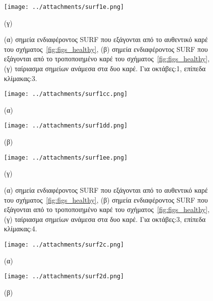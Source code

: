 \begin{figure}[h!]
\begin{minipage}[b]{1.0\linewidth}
\centering
\texttt{[image: ../attachments/surf1e.png]}
\caption*{(γ)}
\label{fig:surf_3}
\end{minipage}
\caption{(α) σημεία ενδιαφέροντος SURF που εξάγονται από το αυθεντικό καρέ του σχήματος~\ref{fig:figs_healthy},
(β) σημεία ενδιαφέροντος SURF που εξάγονται από το τροποποιημένο καρέ του σχήματος~\ref{fig:figs_healthy},
(γ) ταίριασμα σημείων ανάμεσα στα δυο καρέ. Για οκτάβες:1, επίπεδα κλίμακας:3.}
\label{fig:surf_healthy_1}
\end{figure}

 
\newpage

\begin{figure}[!ht]
\begin{minipage}[b]{0.4\linewidth}
\centering
\texttt{[image: ../attachments/surf1cc.png]}
\caption*{(α)}
\label{fig:surf_4}
\end{minipage}
\hspace{0.9cm}
\begin{minipage}[b]{0.7\linewidth}
\centering
\texttt{[image: ../attachments/surf1dd.png]}
\caption*{(β)}
\label{fig:surf_5}
\end{minipage}

 \end{figure}


 
\begin{figure}[!h]
\begin{minipage}[b]{1.0\linewidth}
\centering
\texttt{[image: ../attachments/surf1ee.png]}
\caption*{(γ)}
\label{fig:surf_6}
\end{minipage}
\caption{(α) σημεία ενδιαφέροντος SURF που εξάγονται από το αυθεντικό καρέ του σχήματος~\ref{fig:figs_healthy},
(β) σημεία ενδιαφέροντος SURF που εξάγονται από το τροποποιημένο καρέ του σχήματος~\ref{fig:figs_healthy},
(γ) ταίριασμα σημείων ανάμεσα στα δυο καρέ. Για οκτάβες:3, επίπεδα κλίμακας:4.}
\label{fig:surf_healthy_2}
\end{figure}
 
 

\newpage


 
\begin{figure}[!ht]
\begin{minipage}[b]{0.4\linewidth}
\centering
\texttt{[image: ../attachments/surf2c.png]}
\caption*{(α)}
\label{fig:surf_7}
\end{minipage}
\hspace{0.9cm}
\begin{minipage}[b]{0.7\linewidth}
\centering
\texttt{[image: ../attachments/surf2d.png]}
\caption*{(β)}
\label{fig:surf_8}
\end{minipage}

 \end{figure}

